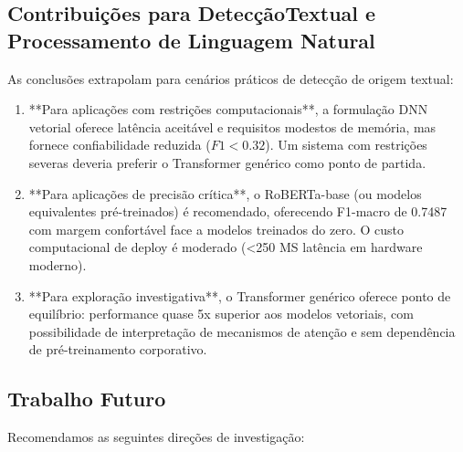 \documentclass[runningheads]{llncs}
\begin{document}
\subsection{Contribuições para DetecçãoTextual e Processamento de Linguagem Natural}

As conclusões extrapolam para cenários práticos de detecção de origem textual:
\begin{enumerate}
    \item **Para aplicações com restrições computacionais**, a formulação DNN vetorial oferece latência aceitável e requisitos modestos de memória, mas fornece confiabilidade reduzida ($F1 < 0.32$). Um sistema com restrições severas deveria preferir o Transformer genérico como ponto de partida.
    
    \item **Para aplicações de precisão crítica**, o RoBERTa-base (ou modelos equivalentes pré-treinados) é recomendado, oferecendo F1-macro de 0.7487 com margem confortável face a modelos treinados do zero. O custo computacional de deploy é moderado (<250 MS latência em hardware moderno).
    
    \item **Para exploração investigativa**, o Transformer genérico oferece ponto de equilíbrio: performance quase 5x superior aos modelos vetoriais, com possibilidade de interpretação de mecanismos de atenção e sem dependência de pré-treinamento corporativo.
\end{enumerate}

\subsection{Trabalho Futuro}

Recomendamos as seguintes direções de investigação:
\end{document}
